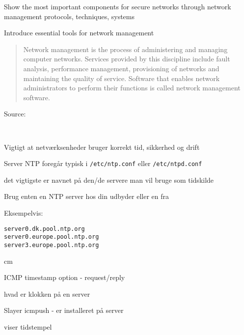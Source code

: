 \documentclass[Screen16to9,17pt]{foils}
\begin{document}


\begin{list1}
\item Show the most important components for secure networks through network management protocols, techniques, systems
\item Introduce essential tools for network management
\end{list1}




\begin{quote}
Network management is the process of administering and managing computer networks. Services provided by this discipline include fault analysis, performance management, provisioning of networks and maintaining the quality of service. Software that enables network administrators to perform their functions is called network management software.\\
\end{quote}

Source:



{~}

\begin{list1}
\item Vigtigt at netværksenheder bruger korrekt tid, sikkerhed og drift
\item Server NTP foregår typisk i \verb+/etc/ntp.conf+ eller \verb+/etc/ntpd.conf+
\item det vigtigste er navnet på den/de servere man vil bruge som tidskilde
\item Brug enten en NTP server hos din udbyder eller en fra 
\item Eksempelvis:
\end{list1}

\begin{alltt}
server 0.dk.pool.ntp.org
server 0.europe.pool.ntp.org
server 3.europe.pool.ntp.org

\end{alltt}


 cm

\begin{list1}
  \item ICMP timestamp option - request/reply
\item hvad er klokken på en server
\item Slayer icmpush - er installeret på server
\item viser tidstempel
\end{list1}
\end{document}
